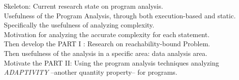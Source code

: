 Skeleton: Current research state on program analysis.
\\
Usefulness of the Program Analysis, through both execution-based and static.
\\
Specifically the usefulness of analyzing complexity.
\\
Motivation for analyzing the accurate complexity for each statement.
\\
Then develop the PART I : Research on reachability-bound Problem.
\\
Then usefulness of the analysis in a specific area: data analysis area.
\\
Motivate the PART II: Using the program analysis techniques analyzing
\emph{ADAPTIVITY} --another quantity property-- for programs.